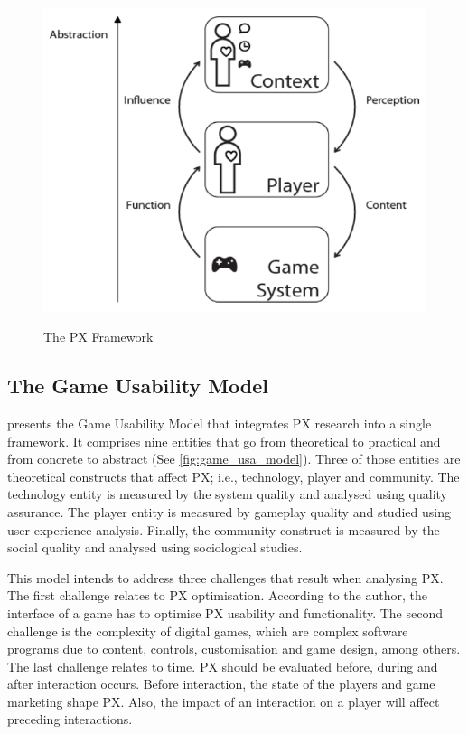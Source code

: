 \begin{figure}[bth]
\myfloatalign
{\includegraphics[width=.7\linewidth]{gfx/model/px_framework}} \quad
\caption[The PX Framework]{The \ac{PX} Framework \autocite{Nackea2}}\label{fig:px_framework}
\end{figure}

\subsection{The Game Usability Model}
\textcite{Nacked} presents the Game Usability Model that integrates \ac{PX} research into a single framework. It comprises nine entities that go from theoretical to practical and from concrete to abstract (See \autoref{fig:game_usa_model}). Three of those entities are theoretical constructs that affect \ac{PX}; i.e., technology, player and community. The technology entity is measured by the system quality and analysed using quality assurance. The player entity is measured by gameplay quality and studied using user experience analysis. Finally, the community construct is measured by the social quality and analysed using sociological studies.

This model intends to address three challenges that result when analysing \ac{PX}. The first challenge relates to \ac{PX} optimisation. According to the author, the interface of a game has to optimise \ac{PX} usability and functionality. The second challenge is the complexity of digital games, which are complex software programs due to content, controls, customisation and game design, among others. The last challenge relates to time. \ac{PX} should be evaluated before, during and after interaction occurs. Before interaction, the state of the players and game marketing shape \ac{PX}. Also, the impact of an interaction on a player will affect preceding interactions.

